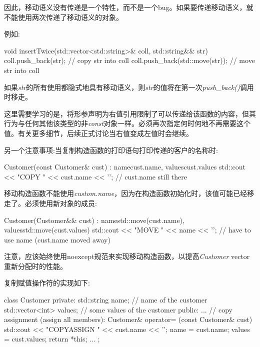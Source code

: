 因此，移动语义没有传递是一个特性，而不是一个bug。如果要传递移动语义，就不能使用两次传递了移动语义的对象。\par

例如:\par

\begin{codebox}[cpp]
void insertTwice(std::vector<std::string>& coll, std::string&& str)
{
  coll.push_back(str); // copy str into coll
  coll.push_back(std::move(str)); // move str into coll
}
\end{codebox}

如果\textit{str}的所有使用都隐式地具有移动语义，则\textit{str}的值将在第一次\textit{push\_\allowbreak{}back(\allowbreak{})\allowbreak{}}调用时移走。\par

这里需要学习的是，将形参声明为右值引用限制了可以传递给该函数的内容，但其行为与任何其他该类型的非\textit{const}对象一样。必须再次指定何时何地不再需要这个值。有关更多细节，后续正式讨论当右值变成左值时会继续。\par

另一个注意事项:当复制构造函数的打印语句打印传递的客户的名称时:\par

\begin{codebox}[cpp]
Customer(const Customer& cust)
: name{cust.name}, values{cust.values} {
  std::cout << "COPY " << cust.name << '\n'; // cust.name still there
}
\end{codebox}

移动构造函数不能使用\textit{custom.name}，因为在构造函数初始化时，该值可能已经移走了。必须使用新对象的成员:\par

\begin{codebox}[cpp]
Customer(Customer&& cust)
: name{std::move(cust.name)}, values{std::move(cust.values)} {
  std::cout << "MOVE " << name << '\n'; // have to use name (cust.name moved away)
}
\end{codebox}

注意，应该始终使用noexcept规范来实现移动构造函数，以提高\textit{Customer} vector重新分配时的性能。\par


复制赋值操作符的实现如下:\par

\begin{codebox}[cpp]
class Customer {
  private:
  std::string name; // name of the customer
  std::vector<int> values; // some values of the customer
  public:
  ...
  // copy assignment (assign all members):
  Customer& operator= (const Customer& cust) {
    std::cout << "COPYASSIGN " << cust.name << '\n';
    name = cust.name;
    values = cust.values;
    return *this;
  }
...
};
\end{codebox}

